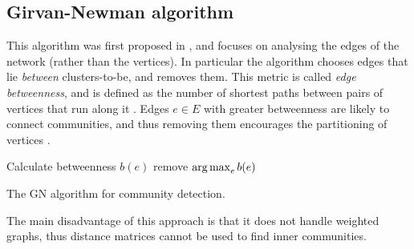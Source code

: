 \documentclass[../main.tex]{subfiles} \label{chapter_soa}
\begin{document}
\subsection{Girvan-Newman algorithm} \label{subsection_gn}
This algorithm was first proposed in \cite{Girvan2002}, and focuses on analysing the edges of the network (rather than the vertices). In particular the algorithm chooses edges that lie \emph{between} clusters-to-be, and removes them. This metric is called \emph{edge betweenness}, and is defined as the number of shortest paths between pairs of vertices that run along it \cite{Girvan2002}. Edges $e\in E$ with greater betweenness are likely to connect communities, and thus removing them encourages the partitioning of vertices \cite{Lu2012}.
\begin{algorithm}
\begin{algorithmic}[1]
\Repeat
{}
    \State Calculate betweenness $b(e)$
\EndFor
\State remove $\operatorname*{arg\,max}_e{b(e)}$
\EndFunction
\caption{The GN algorithm for community detection.}\label{alg_gn}
\end{algorithmic}
\end{algorithm}
\par The main disadvantage of this approach is that it does not handle weighted graphs, thus distance matrices cannot be used to find inner communities.
\end{document}
